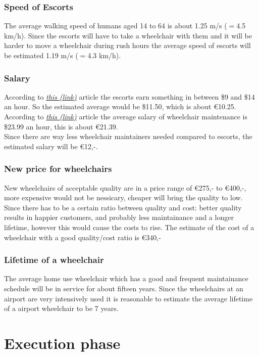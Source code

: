 \documentclass[a4paper, 12pt, notitlepage]{report}
\begin{document}
    \subsection{Speed of Escorts}
    The average walking speed of humans aged 14 to 64 is about 1.25 m/s  ($=$4.5 km/h). Since the escorts will have to take a wheelchair with them and it will be harder to move a wheelchair during rush hours the average speed of escorts will be estimated 1.19 m/s ($=$4.3 km/h).
    \subsection{Salary}
    According to \href{https://disabledaccessdenied.wordpress.com/2012/10/08/airport-wheelchair-fakes-are-making-life-hard-for-disabled-travellers/}{\emph{this (link)}} article the escorts earn something in between \$9 and \$14 an hour. So the estimated average would be \$11.50, which is about \euro{10.25}.\\
    According to \href{http://work.chron.com/average-wage-wheelchair-repair-19790.html}{\emph{this (link)}} article the average salary of wheelchair maintenance is \$23.99 an hour, this is about \euro{21.39}.\\
    Since there are way less wheelchair maintainers needed compared to escorts, the estimated salary will be \euro{12,-}.
    \subsection{New price for wheelchairs}
    New wheelchairs of acceptable quality are in a price range of \euro{275,-} to \euro{400,-}, more expensive would not be nessicary, cheaper will bring the quality to low. Since there has to be a certain ratio between quality and cost: better quality results in happier customers, and probably less maintainance and a longer lifetime, however this would cause the costs to rise. The estimate of the cost of a wheelchair with a good quality/cost ratio is \euro{340,-}
    \subsection{Lifetime of a wheelchair}
    The average home use wheelchair which has a good and frequent maintainance schedule will be in service for about fifteen years. Since the wheelchairs at an airport are very intensively used it is reasonable to estimate the average lifetime of a airport wheelchair to be 7 years.
\chapter{Execution phase}
\end{document}
